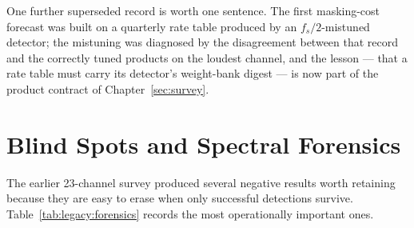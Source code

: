 One further superseded record is worth one sentence.  The first masking-cost
forecast was built on a quarterly rate table produced by an $f_s/2$-mistuned
detector; the mistuning was diagnosed by the disagreement between that record
and the correctly tuned products on the loudest channel, and the lesson ---
that a rate table must carry its detector's weight-bank digest --- is now part
of the product contract of Chapter~\ref{sec:survey}.

\section{Blind Spots and Spectral Forensics}

The earlier 23-channel survey produced several negative results worth retaining
because they are easy to erase when only successful detections survive.
Table~\ref{tab:legacy:forensics} records the most operationally important ones.

